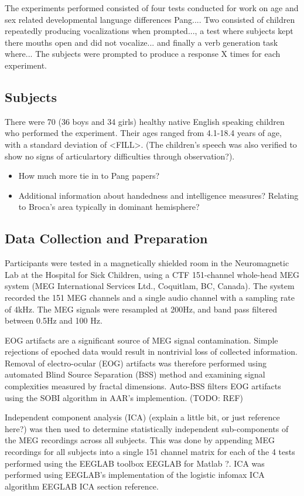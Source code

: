\documentclass[a4paper]{article}
\begin{document}
The experiments performed consisted of four tests conducted for work on age and sex related developmental language differences {Pang...}. Two consisted of children repeatedly producing vocalizations when prompted..., a test where subjects kept there mouths open and did not vocalize... and finally a verb generation task where... The subjects were prompted to produce a response X times for each experiment.

\subsection{Subjects}

There were 70 (36 boys and 34 girls) healthy native English speaking children who performed the experiment. Their ages ranged from 4.1-18.4 years of age, with a standard deviation of <FILL>. (The children's speech was also verified to show no signs of articulartory difficulties through observation?).

\begin{itemize}
\item How much more tie in to Pang papers?
\item Additional information about handedness and intelligence measures? Relating to Broca's area typically in dominant hemisphere?
\end{itemize}

\subsection{Data Collection and Preparation}

Participants were tested in a magnetically shielded room in the Neuromagnetic Lab at the Hospital for Sick Children, using a CTF 151-channel whole-head MEG system (MEG International Services Ltd., Coquitlam, BC, Canada). The system recorded the 151 MEG channels and a single audio channel with a sampling rate of 4kHz. The MEG signals were resampled at 200Hz, and band pass filtered between 0.5Hz and 100 Hz.

EOG artifacts are a significant source of MEG signal contamination. Simple rejections of epoched data would result in nontrivial loss of collected information. Removal of electro-ocular (EOG) artifacts was therefore performed using automated Blind Source Separation (BSS) method and examining signal complexities measured by fractal dimensions. Auto-BSS filters EOG artifacts using the SOBI algorithm in AAR's implemention. (TODO: REF)

Independent component analysis (ICA) (explain a little bit, or just reference here?) was then used to determine statistically independent sub-components of the MEG recordings across all subjects. This was done by appending MEG recordings for all subjects into a single 151 channel matrix for each of the 4 tests performed using the EEGLAB toolbox {EEGLAB} for Matlab {?}. ICA was performed using EEGLAB's implementation of the logistic infomax ICA algorithm {EEGLAB ICA section reference}.
\end{document}
